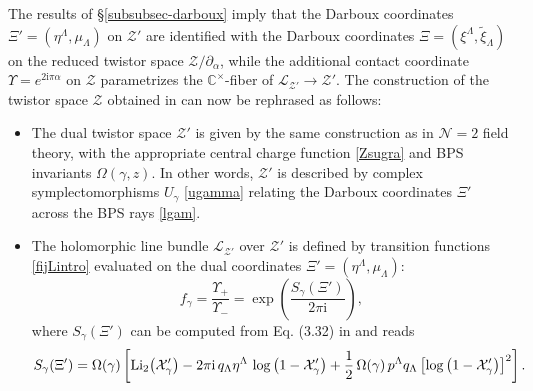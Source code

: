 \documentclass[12pt,reqno]{article}
\numberwithin{equation}{section}
\newcommand{\be}{\begin{equation}}
\newcommand{\ee}{\end{equation}}
\def\[{\left[}
\def\]{\right]}
\newcommand{\I}{\mathrm{i}}
\newcommand{\cN}{\mathcal{N}}
\newcommand{\cX}{\mathcal{X}}
\newcommand{\cZ}{\mathcal{Z}}
\newcommand{\lb}{\mathscr{L}}
\def\pcZ{\cZ'}
\numberwithin{equation}{section}
\begin{document}
The results of \S\ref{subsubsec-darboux} imply that
 the Darboux coordinates $\Xi'=(\eta^\Lambda, \mu_\Lambda)$ on $\pcZ$ are identified
 with the Darboux coordinates $\Xi=(\xi^{\Lambda}, \tilde\xi_\Lambda)$
on the reduced twistor space  $\cZ/\partial_\alpha $, while
the additional contact coordinate $\Upsilon=e^{2\I \pi \alpha}$ on $\cZ$
parametrizes the $\mathbb{C}^{\times}$-fiber of $\lb_{\pcZ}\to \pcZ$.
The construction of the twistor space $\cZ$ obtained in
\cite{Alexandrov:2008gh}  can now be rephrased as follows:
\begin{itemize}
\item[i)] The dual twistor space  $\pcZ$
is given by the same construction as in $\cN=2$ field theory, with
the appropriate central charge function \eqref{Zsugra} and BPS invariants
$\Omega(\gamma, z)$. In other words,
$\pcZ$ is described by complex symplectomorphisms $U_\gamma$ \eqref{ugamma}
relating the Darboux coordinates $\Xi'$
across the BPS rays \eqref{lgam}.
\item[ii)] The holomorphic line bundle $\lb_{{\pcZ}}$ over $\pcZ$
is defined by transition functions \eqref{fijLintro} evaluated on the
dual coordinates $\Xi'=(\eta^{\Lambda}, \mu_\Lambda)$:
\be
\label{fijL}
f_{\gamma} = \frac{\Upsilon_+}{\Upsilon_-}=   \exp\left( \frac{S_\gamma(\Xi')}{2\pi\I} \right),
\ee
where $S_\gamma(\Xi')$ can be computed from Eq. (3.32) in \cite{Alexandrov:2009zh} and reads
\be
\label{dirtySgamma}
S_\gamma(\Xi') =  \Omega(\gamma) \[ {\rm Li}_2\big(\cX'_\gamma\big)
-2\pi \I \, q_\Lambda \eta^{\Lambda}\,  \log\left(1-\cX'_\gamma\right)
+\frac12\, {\Omega(\gamma)} \, p^{\Lambda}q_\Lambda
\left[\log\left(1-\cX'_\gamma\right)\right]^2 \] .
\ee
\end{itemize}
\end{document}
